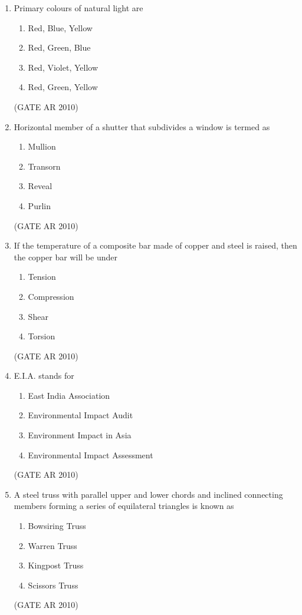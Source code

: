 \documentclass[journal]{IEEEtran}
\begin{document}
\begin{enumerate}
\item Primary colours of natural light are
\begin{multicols}{2}
\begin{enumerate}
\item Red, Blue, Yellow
\item Red, Green, Blue
\item Red, Violet, Yellow
\item Red, Green, Yellow
\end{enumerate}
\end{multicols}
\hfill (GATE AR 2010)

\item Horizontal member of a shutter that subdivides a window is termed as
\begin{multicols}{4}
\begin{enumerate}
\item Mullion
\item Transorn
\item Reveal
\item Purlin
\end{enumerate}
\end{multicols}
\hfill (GATE AR 2010)

\item If the temperature of a composite bar made of copper and steel is raised, then the copper bar will be under
\begin{multicols}{4}
\begin{enumerate}
\item Tension
\item Compression
\item Shear
\item Torsion
\end{enumerate}
\end{multicols}
\hfill (GATE AR 2010)

\item E.I.A. stands for
\begin{multicols}{2}
\begin{enumerate}
\item East India Association
\item Environmental Impact Audit
\item Environment Impact in Asia
\item Environmental Impact Assessment
\end{enumerate}
\end{multicols}
\hfill (GATE AR 2010)

\item A steel truss with parallel upper and lower chords and inclined connecting members forming a series of equilateral triangles is known as
\begin{multicols}{2}
\begin{enumerate}
\item Bowsiring Truss
\item Warren Truss
\item Kingpost Truss
\item Scissors Truss
\end{enumerate}
\end{multicols}
\hfill (GATE AR 2010)


\end{enumerate}
\end{document}
